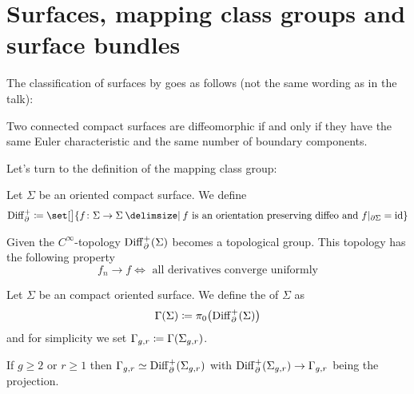 \section{Surfaces, mapping class groups and surface bundles}



The classification of surfaces by \textcite[chap.~9, thm.~3.11]{hirschDifferential} goes as follows (not the same wording as in the talk):
\begin{theorem}[{name={classification of surfaces}}]
	Two connected compact surfaces are diffeomorphic if and only if they have the same Euler characteristic and the same number of boundary components.
\end{theorem}

Let's turn to the definition of the mapping class group: 

\begin{definition}
	Let $\Sigma$ be an oriented compact surface. 
	We define
	\[
		\Diff_{\partial}^+ \coloneqq \set[\big]{f \colon \Sigma \to \Sigma \given f \text{ is an orientation preserving diffeo and } f|_{\partial \Sigma} = {\id}}
	\]
\end{definition}

\begin{remark}
	Given the $C^\infty$-topology $\operatorname{Diff}_\partial^+(\Sigma)$ becomes a topological group.
	This topology has the following property
	\[
		f_n \to f \iff \text{ all derivatives converge uniformly} 
	\]	
\end{remark}

\begin{definition}
	Let $\Sigma$ be an compact oriented surface.
	We define the  of $\Sigma$ as
	\[
		\Gamma(\Sigma) \coloneqq \pi_0 \enbrace*{\Diff_\partial^+(\Sigma)}
	\]
	and for simplicity we set $\Gamma_{g,r} \coloneqq \Gamma \enbrace*{\Sigma_{g,r}}$.
\end{definition}

\begin{theorem}[{name={Earle-Eells}}]
	If $g \ge 2$ or $r \ge 1$ then $\Gamma_{g,r} \simeq \operatorname{Diff}_\partial^+(\Sigma_{g,r})$ with $\operatorname{Diff}_\partial^+(\Sigma_{g,r}) \to \Gamma_{g,r}$ being the projection.
\end{theorem}

